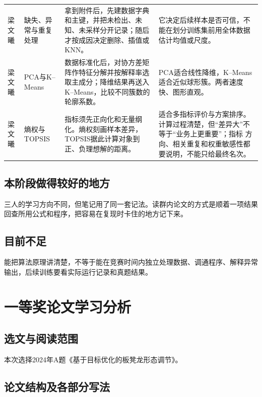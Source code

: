 \documentclass[UTF8,zihao=-4]{ctexart}
\begin{document}
\begin{longtable}{p{1.25cm}p{2.55cm}p{6.25cm}p{5.45cm}}
梁文曦 & 缺失、异常与重复处理
& 拿到附件后，先建数据字典和主键，并把未检出、未知、未采样分开记录；随后才按成因决定删除、插值或KNN。
& 它决定后续样本是否可信，不能在划分训练集前用全体数据估计均值或尺度。\\

梁文曦 & PCA与K--Means
& 数据标准化后，对协方差矩阵作特征分解并按解释率选取主成分；降维结果再送入K--Means，比较不同簇数的轮廓系数。
& PCA适合线性降维，K--Means适合近似球形簇。两者速度快、图形直观。\\

梁文曦 & 熵权与TOPSIS
& 指标须先正向化和无量纲化。熵权刻画样本差异，TOPSIS据此计算对象到正、负理想解的距离。
& 适合多指标评价与方案排序。计算过程清楚，但“差异大”不等于“业务上更重要”；指标
方向、相关重复和权重敏感性都要说明，不能只给最终名次。\\
\end{longtable}
\normalsize

\subsection{本阶段做得较好的地方}

三人的学习方向不同，但笔记用了同一套记法。读群内论文的方式是顺着一项结果回查所用公式和程序，把容易在复现时卡住的地方记下来。

\subsection{目前不足}

能把算法原理讲清楚，不等于能在竞赛时间内独立处理数据、调通程序、解释异常输出，后续训练要看实际运行记录和真题结果。

\section{一等奖论文学习分析}

\subsection{选文与阅读范围}

本次选择2024年A题《基于目标优化的板凳龙形态调节》。

\subsection{论文结构及各部分写法}
\end{document}
